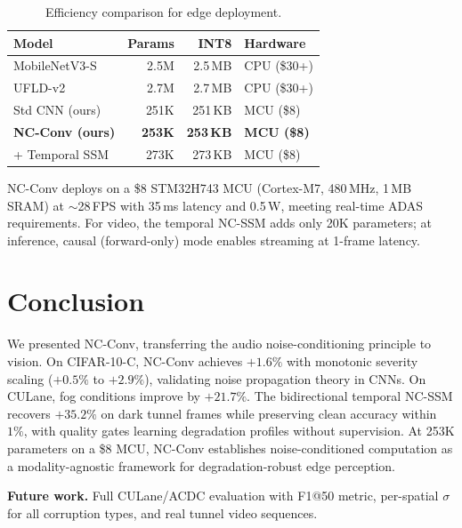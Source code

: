 \documentclass[runningheads]{llncs}
\begin{document}
\begin{table}[t]
\centering
\caption{Efficiency comparison for edge deployment.}
\label{tab:efficiency}
\small
\begin{tabular}{@{}lrrl@{}}
\toprule
\textbf{Model} & \textbf{Params} & \textbf{INT8} & \textbf{Hardware} \\
\midrule
MobileNetV3-S & 2.5M & 2.5\,MB & CPU (\$30+) \\
UFLD-v2 & 2.7M & 2.7\,MB & CPU (\$30+) \\
\midrule
Std CNN (ours) & 251K & 251\,KB & MCU (\$8) \\
\textbf{NC-Conv (ours)} & \textbf{253K} & \textbf{253\,KB} & \textbf{MCU (\$8)} \\
+ Temporal SSM & 273K & 273\,KB & MCU (\$8) \\
\bottomrule
\end{tabular}
\end{table}

NC-Conv deploys on a \$8 STM32H743 MCU (Cortex-M7, 480\,MHz, 1\,MB SRAM) at ${\sim}$28\,FPS with 35\,ms latency and 0.5\,W, meeting real-time ADAS requirements.
For video, the temporal NC-SSM adds only 20K parameters; at inference, causal (forward-only) mode enables streaming at 1-frame latency.


\section{Conclusion}
\label{sec:conclusion}

We presented NC-Conv, transferring the audio noise-conditioning principle to vision.
On CIFAR-10-C, NC-Conv achieves $+1.6\%$ with monotonic severity scaling ($+0.5\%$ to $+2.9\%$), validating noise propagation theory in CNNs.
On CULane, fog conditions improve by $+21.7\%$.
The bidirectional temporal NC-SSM recovers $+35.2\%$ on dark tunnel frames while preserving clean accuracy within $1\%$, with quality gates learning degradation profiles without supervision.
At 253K parameters on a \$8 MCU, NC-Conv establishes noise-conditioned computation as a modality-agnostic framework for degradation-robust edge perception.

\noindent\textbf{Future work.}
Full CULane/ACDC evaluation with F1@50 metric, per-spatial $\sigma$ for all corruption types, and real tunnel video sequences.




\end{document}
